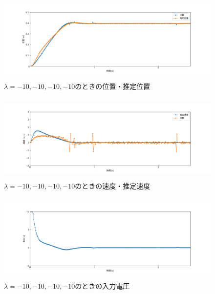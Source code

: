 \documentclass[12pt]{jsarticle}
\begin{document}
\begin{figure}[H]
  \begin{center}
    \includegraphics[clip,width=13.0cm, height=4.4cm]{../img/Exp1-1.png}
    \caption{$\lambda=-10, -10, -10, -10$のときの位置・推定位置}
    \label{Exp1-1}
  \end{center}
\end{figure}
\begin{figure}[H]
  \begin{center}
    \includegraphics[clip,width=13.0cm, height=4.4cm]{../img/Exp1-2.png}
    \caption{$\lambda=-10, -10, -10, -10$のときの速度・推定速度}
    \label{Exp1-2}
  \end{center}
\end{figure}
\begin{figure}[H]
  \begin{center}
    \includegraphics[clip,width=13.0cm, height=4.4cm]{../img/Exp1-3.png}
    \caption{$\lambda=-10, -10, -10, -10$のときの入力電圧}
    \label{Exp1-3}
  \end{center}
\end{figure}
\end{document}
